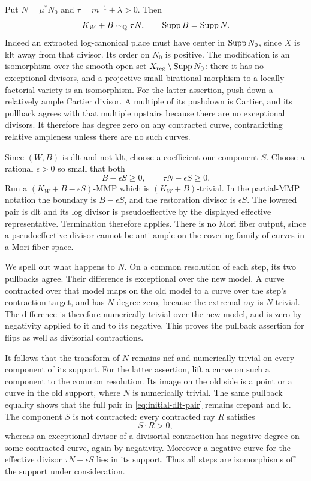 Put \(N=\mu^*N_0\) and \(\tau=m^{-1}+\lambda>0\).  Then
\begin{equation}
\label{eq:initial-dlt-pair}
 K_W+B\sim_{\mathbb Q}\tau N,\qquad \operatorname{Supp} B=\operatorname{Supp} N.
\end{equation}
Indeed an extracted log-canonical place must have center in \(\operatorname{Supp} N_0\),
since \(X\) is klt away from that divisor.  Its order on \(N_0\) is positive.
The modification is an isomorphism over the smooth open set
\(X_{\mathrm{reg}}\setminus\operatorname{Supp} N_0\): there it has no exceptional divisors,
and a projective small birational morphism to a locally factorial variety
is an isomorphism.  For the latter assertion, push down a relatively ample
Cartier divisor.  A multiple of its pushdown is Cartier, and its pullback
agrees with that multiple upstairs because there are no exceptional
divisors.  It therefore has degree zero on any contracted curve,
contradicting relative ampleness unless there are no such curves.

Since \((W,B)\) is dlt and not klt, choose a coefficient-one component \(S\).
Choose a rational \(\epsilon>0\) so small that both
\[
 B-\epsilon S\geq0,\qquad \tau N-\epsilon S\geq0.
\]
Run a \((K_W+B-\epsilon S)\)-MMP which is
\((K_W+B)\)-trivial.  In the partial-MMP notation the boundary is
\(B-\epsilon S\), and the restoration divisor is \(\epsilon S\).
The lowered pair is dlt and its log divisor is pseudoeffective by the
displayed effective representative.  Termination therefore applies.
There is no Mori fiber output, since a pseudoeffective divisor cannot be
anti-ample on the covering family of curves in a Mori fiber space.

We spell out what happens to \(N\).  On a common resolution of each step,
its two pullbacks agree.  Their difference is exceptional over the new
model.  A curve contracted over that model maps on the old model to a
curve over the step's contraction target, and has \(N\)-degree zero,
because the extremal ray is \(N\)-trivial.  The difference is therefore
numerically trivial over the new model, and is zero by negativity applied
to it and to its negative.  This proves the pullback assertion for flips
as well as divisorial contractions.

It follows that the transform of \(N\) remains nef and numerically trivial
on every component of its support.  For the latter assertion, lift a
curve on such a component to the common resolution.  Its image on the
old side is a point or a curve in the old support, where \(N\) is
numerically trivial.  The same pullback equality shows that the full
pair in \eqref{eq:initial-dlt-pair} remains crepant and lc.
The component \(S\) is not contracted: every contracted ray \(R\) satisfies
\[
 S\cdot R>0,
\]
whereas an exceptional divisor of a divisorial contraction has negative
degree on some contracted curve, again by negativity.
Moreover a negative curve for the effective divisor
\(\tau N-\epsilon S\) lies in its support.  Thus all steps are
isomorphisms off the support under consideration.

